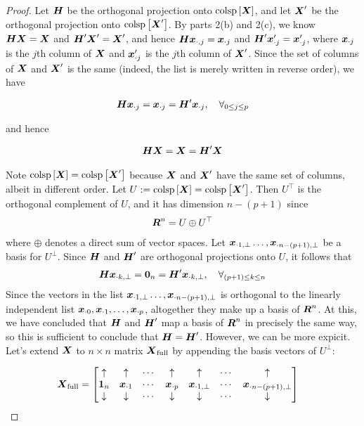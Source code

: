 \documentclass[12pt]{article}
\begin{document}
\begin{enumerate}
\begin{proof}
	
Let $\boldsymbol{H}$ be the orthogonal projection onto $\text{colsp}\left[\boldsymbol{X}\right]$, and
let $\boldsymbol{X}'$ be the orthogonal projection onto $\text{colsp}\left[\boldsymbol{X}'\right]$. By parts 2(b) and 2(c),
we know $\boldsymbol{H}\boldsymbol{X}=\boldsymbol{X}$ and $\boldsymbol{H}'\boldsymbol{X}'=\boldsymbol{X}'$, and hence $\boldsymbol{H}\boldsymbol{x}_{\cdot, j}=\boldsymbol{x}_{\cdot j}$
and $\boldsymbol{H}'\boldsymbol{x}'_{\cdot j}=\boldsymbol{x}'_{\cdot j}$, where $\boldsymbol{x}_{\cdot j}$ is the $j$th column
of $\boldsymbol{X}$ and $\boldsymbol{x}'_{\cdot j}$ is the $j$th column of $\boldsymbol{X}'$. Since the set of columns
of $\boldsymbol{X}$ and $\boldsymbol{X}'$ is the same (indeed, the list is merely written in reverse order),
we have

\begin{align*}
	\boldsymbol{H}\boldsymbol{x}_{\cdot j}=\boldsymbol{x}_{\cdot j}=\boldsymbol{H}'\boldsymbol{x}_{\cdot j},\quad \forall_{0\leq j\leq p}
\end{align*}

and hence

\begin{align*}
	\boldsymbol{H}\boldsymbol{X} = \boldsymbol{X} = \boldsymbol{H}'\boldsymbol{X}	
\end{align*}

Note $\text{colsp}\left[\boldsymbol{X}\right]=\text{colsp}\left[\boldsymbol{X}'\right]$ because $\boldsymbol{X}$ and $\boldsymbol{X}'$ have the same set of columns,
albeit in different order. Let $U:=\text{colsp}\left[\boldsymbol{X}\right]=\text{colsp}\left[\boldsymbol{X}'\right]$. Then $U^\top$ is the orthogonal
complement of $U$, and it has dimension $n-(p+1)$ since
\begin{align*}
	\boldsymbol{R}^n = U \oplus U^\top
\end{align*}
where $\oplus$ denotes a direct sum of vector spaces. Let
$\boldsymbol{x}_{\cdot 1,\perp}\ldots,\boldsymbol{x}_{\cdot n-(p+1),\perp}$ be a basis for $U^\perp$. Since
$\boldsymbol{H}$ and $\boldsymbol{H}'$ are orthogonal projections onto $U$, it follows
that
\begin{align*}
	\boldsymbol{H}\boldsymbol{x}_{\cdot k,\perp}=\mathbf{0}_{n}=\boldsymbol{H}'\boldsymbol{x}_{\cdot k,\perp},\quad \forall_{(p+1)\leq k\leq n}
\end{align*}
Since the vectors in the list $\boldsymbol{x}_{\cdot 1,\perp}\ldots,\boldsymbol{x}_{\cdot n-(p+1),\perp}$
is orthogonal to the linearly independent list $\boldsymbol{x}_{\cdot 0},\boldsymbol{x}_{\cdot 1},\ldots,\boldsymbol{x}_{\cdot p}$,
altogether they make up a basis of $\boldsymbol{R}^n$. At this, we have concluded that $\boldsymbol{H}$
and $\boldsymbol{H}'$ map a basis of $\boldsymbol{R}^n$ in precisely the same way, so this is sufficient
to conclude that $\boldsymbol{H}=\boldsymbol{H}'$. However, we can be more expicit.
Let's extend $\boldsymbol{X}$ to $n\times n$ matrix $\boldsymbol{X}_{\text{full}}$ by appending the
basis vectors of $U^\perp$:

\begin{align*}
	\boldsymbol{X}_{\text{full}}
	&=\begin{bmatrix}
		\uparrow & \uparrow & \cdots & \uparrow & \uparrow & \cdots & \uparrow\\
		\boldsymbol{1}_n  &\boldsymbol{x}_{\cdot 1} & \cdots & \boldsymbol{x}_{\cdot p}
		& \boldsymbol{x}_{\cdot 1,\perp} & \cdots & \boldsymbol{x}_{\cdot n-(p+1),\perp}\\
		\downarrow & \downarrow & \cdots & \downarrow & \downarrow & \cdots & \downarrow\\
	\end{bmatrix}
\end{align*}



\end{proof}
\end{enumerate}
\end{document}
